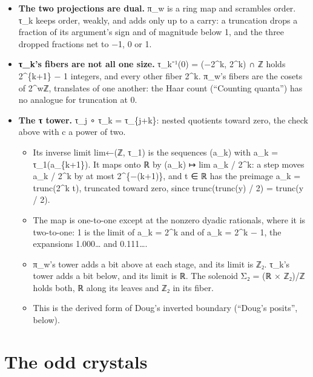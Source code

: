 \begin{itemize}
\item \textbf{The two projections are dual.} π\_\allowbreak{}w is a ring map and scrambles order. τ\_\allowbreak{}k keeps order, weakly, and adds only up to a carry: a truncation drops a fraction of its argument's sign and of magnitude below 1, and the three dropped fractions net to −1, 0 or 1.
\item \textbf{τ\_\allowbreak{}k's fibers are not all one size.} τ\_\allowbreak{}k⁻¹(0) = (−2\textasciicircum{}k, 2\textasciicircum{}k) ∩ ℤ holds 2\textasciicircum{}\{k+1\} − 1 integers, and every other fiber 2\textasciicircum{}k. π\_\allowbreak{}w's fibers are the cosets of 2\textasciicircum{}wℤ, translates of one another: the Haar count (“Counting quanta”) has no analogue for truncation at 0.
\item \textbf{The τ tower.} τ\_\allowbreak{}j ∘ τ\_\allowbreak{}k = τ\_\allowbreak{}\{j+k\}: nested quotients toward zero, the check above with c a power of two.

\begin{itemize}
\item Its inverse limit lim←(ℤ, τ\_\allowbreak{}1) is the sequences (a\_\allowbreak{}k) with a\_\allowbreak{}k = τ\_\allowbreak{}1(a\_\allowbreak{}\{k+1\}). It maps onto ℝ by (a\_\allowbreak{}k) ↦ lim a\_\allowbreak{}k / 2\textasciicircum{}k: a step moves a\_\allowbreak{}k / 2\textasciicircum{}k by at most 2\textasciicircum{}\{−(k+1)\}, and t ∈ ℝ has the preimage a\_\allowbreak{}k = trunc(2\textasciicircum{}k t), truncated toward zero, since trunc(trunc(y) / 2) = trunc(y / 2).
\item The map is one-to-one except at the nonzero dyadic rationals, where it is two-to-one: 1 is the limit of a\_\allowbreak{}k = 2\textasciicircum{}k and of a\_\allowbreak{}k = 2\textasciicircum{}k − 1, the expansions 1.000… and 0.111….
\item π\_\allowbreak{}w's tower adds a bit above at each stage, and its limit is ℤ₂. τ\_\allowbreak{}k's tower adds a bit below, and its limit is ℝ. The solenoid Σ₂ = (ℝ × ℤ₂)/ℤ holds both, ℝ along its leaves and ℤ₂ in its fiber.
\item This is the derived form of Doug's inverted boundary (“Doug's posits”, below).
\end{itemize}
\end{itemize}

\section{\texorpdfstring{The odd crystals}{The odd crystals}}

